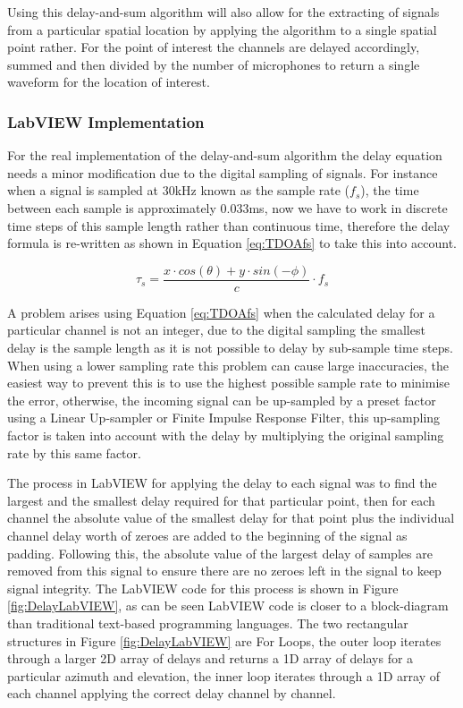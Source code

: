 \documentclass{UoNMCHA}
\numberwithin{equation}{section}
\begin{document}
    Using this delay-and-sum algorithm will also allow for the extracting of signals from a particular spatial location by applying the algorithm to a single spatial point rather. For the point of interest the channels are delayed accordingly, summed and then divided by the number of microphones to return a single waveform for the location of interest.
\subsubsection{LabVIEW Implementation} \label{sec:DAS Implementation}
    For the real implementation of the delay-and-sum algorithm the delay equation needs a minor modification due to the digital sampling of signals. For instance when a signal is sampled at $30$kHz known as the sample rate ($f_s$), the time between each sample is approximately $0.033$ms, now we have to work in discrete time steps of this sample length rather than continuous time, therefore the delay formula is re-written as shown in Equation \ref{eq:TDOAfs} to take this into account.
    
    \begin{equation}
        \tau_s = \frac{x \cdot cos(\theta) + y \cdot sin(-\phi)}{c}\cdot f_s
        \label{eq:TDOAfs}
    \end{equation}
    
    A problem arises using Equation \ref{eq:TDOAfs} when the calculated delay for a particular channel is not an integer, due to the digital sampling the smallest delay is the sample length as it is not possible to delay by sub-sample time steps. When using a lower sampling rate this problem can cause large inaccuracies, the easiest way to prevent this is to use the highest possible sample rate to minimise the error, otherwise, the incoming signal can be up-sampled by a preset factor using a Linear Up-sampler or Finite Impulse Response Filter, this up-sampling factor is taken into account with the delay by multiplying the original sampling rate by this same factor. 
    
    The process in LabVIEW for applying the delay to each signal was to find the largest and the smallest delay required for that particular point, then for each channel the absolute value of the smallest delay for that point plus the individual channel delay worth of zeroes are added to the beginning of the signal as padding. Following this, the absolute value of the largest delay of samples are removed from this signal to ensure there are no zeroes left in the signal to keep signal integrity. The LabVIEW code for this process is shown in Figure \ref{fig:DelayLabVIEW}, as can be seen LabVIEW code is closer to a block-diagram than traditional text-based programming languages. The two rectangular structures in Figure \ref{fig:DelayLabVIEW} are For Loops, the outer loop iterates through a larger 2D array of delays and returns a 1D array of delays for a particular azimuth and elevation, the inner loop iterates through a 1D array of each channel applying the correct delay channel by channel.
    
\end{document}
